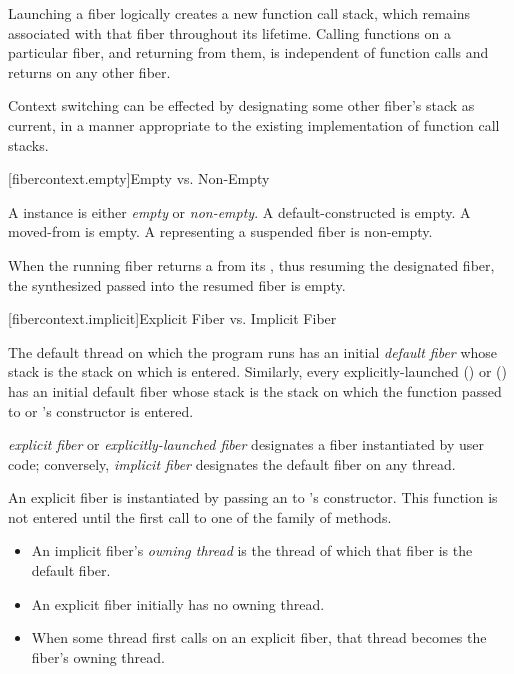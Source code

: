 \para Launching a fiber logically creates a new function call stack, which remains
associated with that fiber throughout its lifetime. Calling functions on a
particular fiber, and returning from them, is independent of function calls
and returns on any other fiber.

\para Context switching can be effected by designating some other fiber's stack as
current, in a manner appropriate to the existing implementation of function call stacks.

[fibercontext.empty]{Empty vs. Non-Empty}

\para A \fiber instance is either \emph{empty} or \emph{non-empty}. A
default-constructed \fiber is empty. A moved-from \fiber is empty. A \fiber
representing a suspended fiber is non-empty.

\para When the running fiber returns a \fiber from its \entryfn, thus resuming the
designated fiber, the synthesized \fiber passed into the resumed fiber is
empty.

[fibercontext.implicit]{Explicit Fiber vs. Implicit Fiber}

\para The default thread on which the program runs \main has an
initial \emph{default fiber} whose stack is the stack on which \main is
entered.  Similarly, every
explicitly-launched  ()
or  () has an initial
default fiber whose stack is the stack on which the function passed
to  or 's constructor is entered.

\para \emph{explicit fiber} or \emph{explicitly-launched fiber}
designates a fiber instantiated by user code; conversely, \emph{implicit fiber}
designates the default fiber on any thread.

\para An explicit fiber is instantiated by passing an \emph{\entryfn} to \fiber's
constructor. This function is not entered until the first call to one of
the  family of methods.

\begin{itemize}
    \item An implicit fiber's \emph{owning thread} is the thread of which that
          fiber is the default fiber.
    \item An explicit fiber initially has no owning thread.
    \item When some thread first calls \anyresume on an explicit fiber, that
          thread becomes the fiber's owning thread.
\end{itemize}

